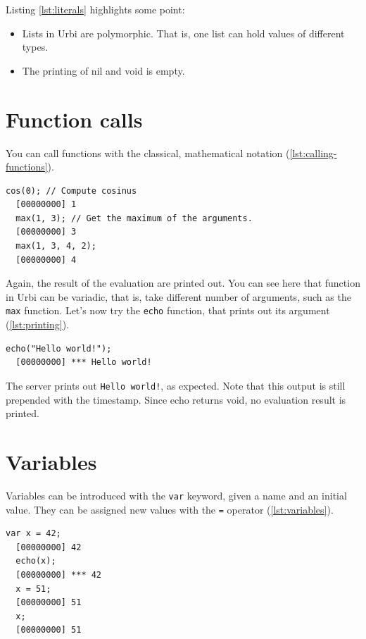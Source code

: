 \documentclass[openright,twoside,12pt]{report}
\newcommand{\urbi}{Urbi\xspace}
\newcommand{\lst}[1]{\autoref{lst:#1}}
\begin{document}
Listing \ref{lst:literals} highlights some point:
\begin{itemize}
\item Lists in \urbi are polymorphic. That is, one list can hold
  values of different types.
\item The printing of nil and void is empty.
\end{itemize}

\section{Function calls}

You can call functions with the classical, mathematical notation
(\lst{calling-functions}).

\begin{lstlisting}[caption=Calling functions,label=lst:calling-functions]
  cos(0); // Compute cosinus
  [00000000] 1
  max(1, 3); // Get the maximum of the arguments.
  [00000000] 3
  max(1, 3, 4, 2);
  [00000000] 4
\end{lstlisting}

Again, the result of the evaluation are printed out. You can see here
that function in \urbi can be variadic, that is, take different number
of arguments, such as the \texttt{max} function. Let's now try the
\texttt{echo} function, that prints out its argument (\lst{printing}).

\begin{lstlisting}[caption=Printing out,label=lst:printing]
  echo("Hello world!");
  [00000000] *** Hello world!
\end{lstlisting}

The server prints out \texttt{Hello world!}, as expected. Note that
this output is still prepended with the timestamp. Since echo returns
void, no evaluation result is printed.

\section{Variables}

Variables can be introduced with the \texttt{var} keyword, given a
name and an initial value. They can be assigned new values with the
\texttt{=} operator (\lst{variables}).

\begin{lstlisting}[caption=Using variables,label=lst:variables]
  var x = 42;
  [00000000] 42
  echo(x);
  [00000000] *** 42
  x = 51;
  [00000000] 51
  x;
  [00000000] 51
\end{lstlisting}
\end{document}
